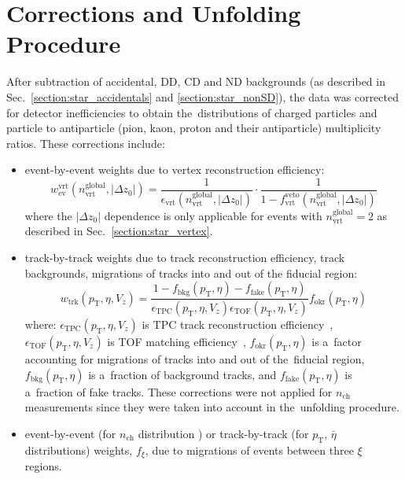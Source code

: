 \chapter{Corrections and Unfolding Procedure}\label{section:star_corrections}
After subtraction of accidental, \ac{DD}, \ac{CD} and \ac{ND} backgrounds (as described in Sec.~\ref{section:star_accidentals} and \ref{section:star_nonSD}), the data was corrected for detector inefficiencies to obtain the~distributions of charged particles and particle to antiparticle (pion, kaon, proton and their antiparticle) multiplicity ratios. These corrections include:
\begin{itemize}
	\item event-by-event weights due to vertex reconstruction efficiency:
\begin{equation}
w_\textrm{ev}^\textrm{vrt}\left(n_\textrm{vrt}^\textrm{global}, |\Delta z_0|\right)=\frac{1}{\epsilon_\textrm{vrt}\left(n_\textrm{vrt}^\textrm{global}, |\Delta z_0|\right)}\cdot\frac{1}{1-f_\textrm{vrt}^\textrm{veto}\left(n_\textrm{vrt}^\textrm{global}, |\Delta z_0|\right)}
\label{eq:vertexCorrection}
\end{equation}
where the 	$|\Delta z_0|$ dependence is only applicable for events with $n_\textrm{vrt}^\textrm{global}=2$ as described in Sec.~\ref{section:star_vertex}.
	\item track-by-track weights due to track reconstruction efficiency, track backgrounds, migrations of tracks into and out of the fiducial region:
\begin{equation}
w_\textrm{trk}\left(p_\textrm{T},\eta,V_{z}\right)=\frac{1-f_\textrm{bkg}\left(p_\textrm{T},\eta\right)-f_\textrm{fake}\left(p_\textrm{T},\eta\right)}{\epsilon_\textrm{TPC}\left(p_\textrm{T},\eta,V_{z}\right)\epsilon_\textrm{TOF}\left(p_\textrm{T},\eta,V_{z}\right)}f_\textrm{okr}\left(p_\textrm{T},\eta\right)
\label{eq:trackCorrection}
\end{equation}
where: $\epsilon_\textrm{TPC}\left(p_\textrm{T},\eta,V_{z}\right)$ is TPC track reconstruction efficiency~\cite{supplementaryNote}, $\epsilon_\textrm{TOF}\left(p_\textrm{T},\eta,V_{z}\right)$ is TOF matching efficiency~\cite{supplementaryNote}, $f_\textrm{okr}\left(p_\textrm{T},\eta\right)$ is a~factor accounting for migrations of tracks into and out of the~fiducial region, $f_\textrm{bkg}\left(p_\textrm{T},\eta\right)$ is a~fraction of background tracks, and $f_\textrm{fake}\left(p_\textrm{T},\eta\right)$ is a~fraction of fake tracks. These corrections were not applied for $n_\textrm{ch}$ measurements since they were taken into account in the~unfolding procedure.
\item event-by-event (for $n_\textrm{ch}$ distribution ) or track-by-track (for $p_\textrm{T}$, $\bar{\eta}$ distributions) weights, $f_{\xi}$, due to migrations of events between three $\xi$ regions.
\end{itemize}
